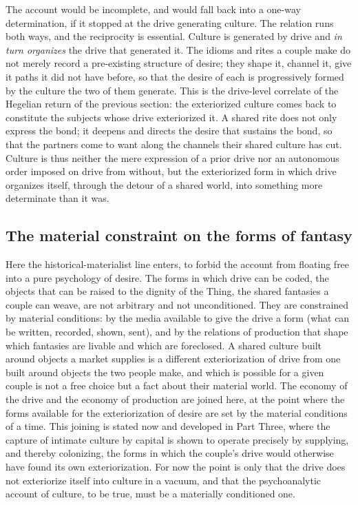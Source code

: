 The account would be incomplete, and would fall back into a one-way determination, if it stopped at the drive generating culture. The relation runs both ways, and the reciprocity is essential. Culture is generated by drive and \emph{in turn organizes} the drive that generated it. The idioms and rites a couple make do not merely record a pre-existing structure of desire; they shape it, channel it, give it paths it did not have before, so that the desire of each is progressively formed by the culture the two of them generate. This is the drive-level correlate of the Hegelian return of the previous section: the exteriorized culture comes back to constitute the subjects whose drive exteriorized it. A shared rite does not only express the bond; it deepens and directs the desire that sustains the bond, so that the partners come to want along the channels their shared culture has cut. Culture is thus neither the mere expression of a prior drive nor an autonomous order imposed on drive from without, but the exteriorized form in which drive organizes itself, through the detour of a shared world, into something more determinate than it was.

\subsection*{The material constraint on the forms of fantasy}

Here the historical-materialist line enters, to forbid the account from floating free into a pure psychology of desire. The forms in which drive can be coded, the objects that can be raised to the dignity of the Thing, the shared fantasies a couple can weave, are not arbitrary and not unconditioned. They are constrained by material conditions: by the media available to give the drive a form (what can be written, recorded, shown, sent), and by the relations of production that shape which fantasies are livable and which are foreclosed. A shared culture built around objects a market supplies is a different exteriorization of drive from one built around objects the two people make, and which is possible for a given couple is not a free choice but a fact about their material world. The economy of the drive and the economy of production are joined here, at the point where the forms available for the exteriorization of desire are set by the material conditions of a time. This joining is stated now and developed in Part Three, where the capture of intimate culture by capital is shown to operate precisely by supplying, and thereby colonizing, the forms in which the couple's drive would otherwise have found its own exteriorization. For now the point is only that the drive does not exteriorize itself into culture in a vacuum, and that the psychoanalytic account of culture, to be true, must be a materially conditioned one.

